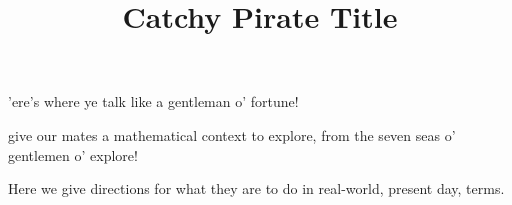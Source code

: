 \documentclass{article}
\title{Catchy Pirate Title}
\begin{document}
\begin{context}
  'ere's where ye talk like a gentleman o' fortune!

  give our mates a mathematical context to explore, from the seven seas o' gentlemen o' explore!
\end{context}

\begin{directions}
  Here we give directions for what they are to do in real-world, present day, terms. 
\end{directions}



\maketitle
\end{document}
